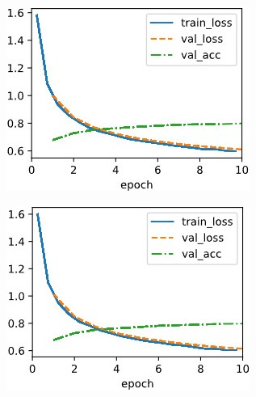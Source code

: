 \documentclass{article}
\begin{document}
\begin{figure}[ht]
\begin{center}
\begin{subfigure}[b]{0.3\columnwidth}
\includegraphics[width=\columnwidth]{img/lr0.01 cosine0.1.jpg}
\end{subfigure}
\hfill
\begin{subfigure}[b]{0.3\columnwidth}\centering
\includegraphics[width=\columnwidth]{img/lr0.01 cosine0.05.jpg}
\end{subfigure}
\hfill
\begin{subfigure}[b]{0.3\columnwidth}\centering

\end{subfigure}
\end{center}
\end{figure}
\end{document}
